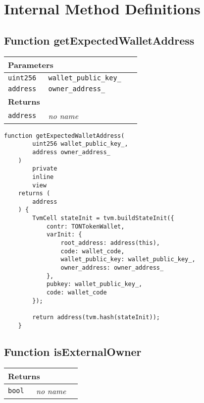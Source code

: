 \section{Internal Method Definitions}


\subsection{Function getExpectedWalletAddress}


\ifsoltables
\noindent\begin{tabular}{|l|l|p{5cm}|}\hline
\multicolumn{3}{|l|}{\bf Parameters}\\\hline
\tt uint256 & \tt wallet\_{}public\_{}key\_{} &\\\hline
\tt address & \tt owner\_{}address\_{} &\\\hline
\multicolumn{3}{|l|}{\bf Returns}\\\hline
\tt address & {\em no name} &\\\hline
\end{tabular}
\fi

\vspace{2cm}

\begin{lstlisting}[firstnumber=485]
    function getExpectedWalletAddress(
        uint256 wallet_public_key_,
        address owner_address_
    )
        private
        inline
        view
    returns (
        address
    ) {
        TvmCell stateInit = tvm.buildStateInit({
            contr: TONTokenWallet,
            varInit: {
                root_address: address(this),
                code: wallet_code,
                wallet_public_key: wallet_public_key_,
                owner_address: owner_address_
            },
            pubkey: wallet_public_key_,
            code: wallet_code
        });

        return address(tvm.hash(stateInit));
    }
\end{lstlisting}

\subsection{Function isExternalOwner}


\ifsoltables
\noindent\begin{tabular}{|l|l|p{5cm}|}\hline
\multicolumn{3}{|l|}{\bf Returns}\\\hline
\tt bool & {\em no name} &\\\hline
\end{tabular}
\fi

